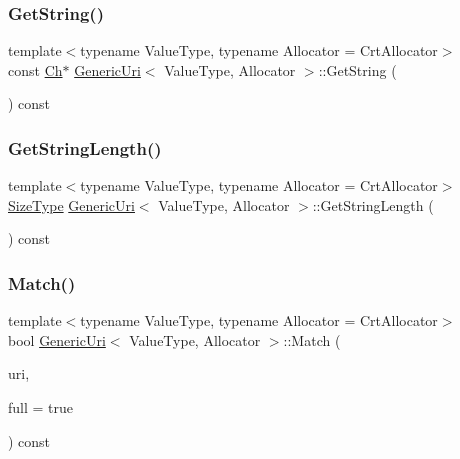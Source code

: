 \mbox{\label{classGenericUri_a14b9fd6884cf1d18a126907e83337cee}} 
\subsubsection{\texorpdfstring{Get\+String()}{GetString()}}
{\footnotesize\ttfamily template$<$typename Value\+Type, typename Allocator = Crt\+Allocator$>$ \\
const \hyperlink{classGenericUri_a20d0602cff62211d89bc4b25963beeee}{Ch}$\ast$ \hyperlink{classGenericUri}{Generic\+Uri}$<$ Value\+Type, Allocator $>$\+::Get\+String (\begin{DoxyParamCaption}{ }\end{DoxyParamCaption}) const\hspace{0.3cm}{\ttfamily [inline]}}

\mbox{\label{classGenericUri_ad8f54ebb7d47030b4b0900b6987d76f7}} 
\subsubsection{\texorpdfstring{Get\+String\+Length()}{GetStringLength()}}
{\footnotesize\ttfamily template$<$typename Value\+Type, typename Allocator = Crt\+Allocator$>$ \\
\hyperlink{rapidjson_8h_a5ed6e6e67250fadbd041127e6386dcb5}{Size\+Type} \hyperlink{classGenericUri}{Generic\+Uri}$<$ Value\+Type, Allocator $>$\+::Get\+String\+Length (\begin{DoxyParamCaption}{ }\end{DoxyParamCaption}) const\hspace{0.3cm}{\ttfamily [inline]}}

\mbox{\label{classGenericUri_a1a35d339917489a66064d21642788aab}} 
\subsubsection{\texorpdfstring{Match()}{Match()}}
{\footnotesize\ttfamily template$<$typename Value\+Type, typename Allocator = Crt\+Allocator$>$ \\
bool \hyperlink{classGenericUri}{Generic\+Uri}$<$ Value\+Type, Allocator $>$\+::Match (\begin{DoxyParamCaption}\item[{const \hyperlink{classGenericUri}{Generic\+Uri}$<$ Value\+Type, Allocator $>$ \&}]{uri,  }\item[{bool}]{full = {\ttfamily true} }\end{DoxyParamCaption}) const\hspace{0.3cm}{\ttfamily [inline]}}

